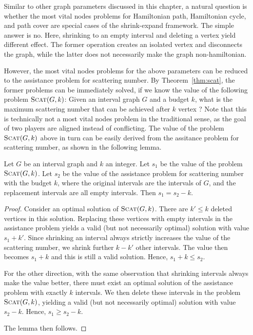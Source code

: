 Similar to other graph parameters discussed in this chapter, a natural question is whether the most vital nodes problems for Hamiltonian path, Hamiltonian cycle, and path cover are special cases of the shrink-expand framework.
The simple answer is no.
Here, shrinking to an empty interval and deleting a vertex yield different effect.
The former operation creates an isolated vertex and disconnects the graph, while the latter does not necessarily make the graph non-hamiltonian.

However, the most vital nodes problems for the above parameters can be reduced to the assistance problem for scattering number.
By Theorem~\ref{thm:scat}, the former problems can be immediately solved, if we know the value of the following problem $\textsc{Scat}(G,k)$: Given an interval graph $G$ and a budget $k$, what is the maximum scattering number that can be achieved after $k$ vertex ?
Note that this is technically not a most vital nodes problem in the traditional sense, as the goal of two players are aligned instead of conflicting.
The value of the problem $\textsc{Scat}(G,k)$ above in turn can be easily derived from the assitance problem for scattering number, as shown in the following lemma.

\begin{lemma}
Let $G$ be an interval graph and $k$ an integer.
Let $s_1$ be the value of the problem $\textsc{Scat}(G,k)$.
Let $s_2$ be the value of the assistance problem for scattering number with the budget $k$, where the original intervals are the intervals of $G$, and the replacement intervals are all empty intervals.
Then $s_1 = s_2 - k$.
\end{lemma}
\begin{proof}
Consider an optimal solution of $\textsc{Scat}(G,k)$.
There are $k' \leq k$ deleted vertices in this solution.
Replacing these vertices with empty intervals in the assistance problem yields a valid (but not necessarily optimal) solution with value $s_1 + k'$.
Since shrinking an interval always strictly increases the value of the scattering number, we shrink further $k - k'$ other intervals.
The value then becomes $s_1 + k$ and this is still a valid solution.
Hence, $s_1 + k \leq s_2$.

For the other direction, with the same observation that shrinking intervals always make the value better, there must exist an optimal solution of the assistance problem with exactly $k$  intervals.
We then delete these intervals in the problem $\textsc{Scat}(G,k)$, yielding a valid (but not necessarily optimal) solution with value $s_2 - k$.
Hence, $s_1 \geq s_2 - k$.

The lemma then follows. 
\end{proof}

